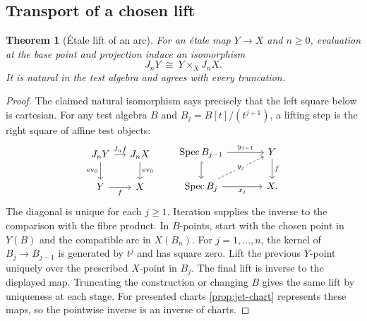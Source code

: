 \documentclass[11pt,a4paper]{article}
\newtheorem{theorem}{Theorem}[section]
\theoremstyle{definition}
\theoremstyle{remark}\newaliascnt{remark}{theorem}
\newcommand{\ev}{\operatorname{ev}}
\newcommand{\Spec}{\operatorname{Spec}}
\numberwithin{equation}{section}
\begin{document}
\subsection{Transport of a chosen lift}
\begin{theorem}[\'Etale lift of an arc]\label{thm:etale-jets}
For an \'etale map $Y\to X$ and $n\ge0$, evaluation at the base point and projection induce an isomorphism
\[
             J_nY \ \cong\ Y\times_X J_nX .
\]
It is natural in the test algebra and agrees with every truncation.
\end{theorem}
\begin{proof}
The claimed natural isomorphism says precisely that the left square below is cartesian. For any test algebra \(B\) and \(B_j=B[t]/(t^{j+1})\), a lifting step is the right square of affine test objects:
\[
\begin{tikzcd}[column sep=small]
 J_nY\arrow[r,"J_nf"]\arrow[d,"\ev_0"']&J_nX\arrow[d,"\ev_0"]\\
 Y\arrow[r,"f"']&X
\end{tikzcd}
\qquad
\begin{tikzcd}[column sep=large]
 \Spec B_{j-1}\arrow[r,"y_{j-1}"]\arrow[d,hook]&Y\arrow[d,"f"]\\
 \Spec B_j\arrow[r,"x_j"']\arrow[ur,dashed,"{y_j}" description]&X .
\end{tikzcd}
\]
The diagonal is unique for each \(j\ge1\). Iteration supplies the inverse to the comparison with the fibre product.
In $B$-points, start with the chosen point in $Y(B)$ and the compatible arc in $X(B_n)$. For $j=1,\ldots,n$, the kernel of $B_j\to B_{j-1}$ is generated by $t^j$ and has square zero. Lift the previous $Y$-point uniquely over the prescribed $X$-point in $B_j$. The final lift is inverse to the displayed map. Truncating the construction or changing $B$ gives the same lift by uniqueness at each stage. For presented charts \cref{prop:jet-chart} represents these maps, so the pointwise inverse is an inverse of charts.
\end{proof}
\end{document}
